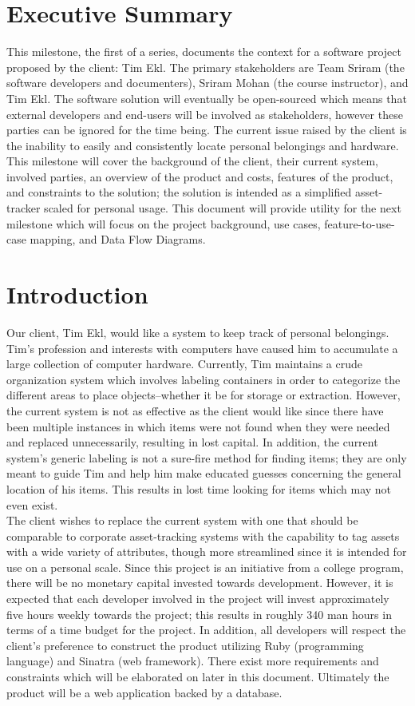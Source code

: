 \documentclass{article}
\begin{document}
\section{Executive Summary}
This milestone, the first of a series, documents the context for a software project proposed by the client: Tim Ekl. The primary stakeholders are Team Sriram (the software developers and documenters), Sriram Mohan (the course instructor), and Tim Ekl.  The software solution will eventually be open-sourced which means that external developers and end-users will be involved as stakeholders, however these parties can be ignored for the time being. The current issue raised by the client is the inability to easily and consistently locate personal belongings and hardware. This milestone will cover the background of the client, their current system, involved parties, an overview of the product and costs, features of the product, and constraints to the solution; the solution is intended as a simplified asset-tracker scaled for personal usage. This document will provide utility for the next milestone which will focus on the project background, use cases, feature-to-use-case mapping, and Data Flow Diagrams.

\section{Introduction}
Our client, Tim Ekl, would like a system to keep track of personal belongings. Tim's profession and interests with computers have caused him to accumulate a large collection of computer hardware. Currently, Tim maintains a crude organization system which involves labeling containers in order to categorize the different areas to place objects--whether it be for storage or extraction. However, the current system is not as effective as the client would like since there have been multiple instances in which items were not found when they were needed and replaced unnecessarily, resulting in lost capital. In addition, the current system's generic labeling is not a sure-fire method for finding items; they are only meant to guide Tim and help him make educated guesses concerning the general location of his items. This results in lost time looking for items which may not even exist.\\
The client wishes to replace the current system with one that should be comparable to corporate asset-tracking systems with the capability to tag assets with a wide variety of attributes, though more streamlined since it is intended for use on a personal scale. Since this project is an initiative from a college program, there will be no monetary capital invested towards development. However, it is expected that each developer involved in the project will invest approximately five hours weekly towards the project; this results in roughly 340 man hours in terms of a time budget for the project. In addition, all developers will respect the client's preference to construct the product utilizing Ruby (programming language) and Sinatra (web framework). There exist more requirements and constraints which will be elaborated on later in this document. Ultimately the product will be a web application backed by a database.
\end{document}
